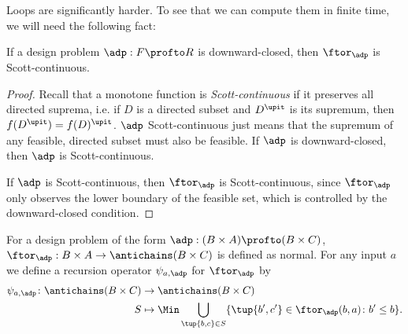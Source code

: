 Loops are significantly harder. To see that we can compute them in finite time, we will need the following fact:
\begin{lemma}
    If a design problem $\adp : F \profto R$ is downward-closed, then $\ftor_\adp$ is Scott-continuous.
\end{lemma}

\begin{proof}
    Recall that a monotone function is \emph{Scott-continuous} if it preserves all directed suprema, i.e. if $D$ is a directed subset and $D^\upit$ is its supremum, then $f(D^\upit) = f(D)^\upit$. $\adp$ Scott-continuous just means that the supremum of any feasible, directed subset must also be feasible. If $\adp$ is downward-closed, then $\adp$ is Scott-continuous.

     

    If $\adp$ is Scott-continuous, then $\ftor_\adp$ is Scott-continuous, since $\ftor_\adp$ only observes the lower boundary of the feasible set, which is controlled by the downward-closed condition.
\end{proof}

For a design problem of the form $\adp : (B \times A) \profto (B \times C)$, $\ftor_\adp : B \times A \to \antichains (B \times C)$ is defined as normal. For any input $a$ we define a recursion operator $\psi_{a,\adp}$ for $\ftor_\adp$ by
\begin{equation}
    \begin{aligned}
        \psi_{a,\adp} \colon \antichains (B \times C) &\to \antichains (B \times C) \\
        S &\mapsto \Min \bigcup_{\tup{b,c} \in S} \{ \tup{b',c'} \in \ftor_\adp(b,a) \colon b' \leq b \}.
    \end{aligned}
\end{equation}

